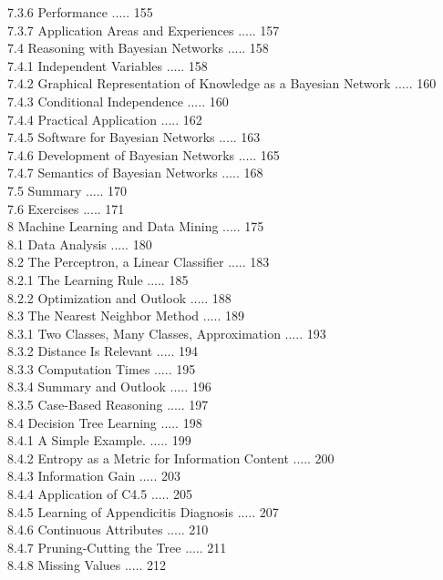 \documentclass[10pt]{book}
\begin{document}
7.3.6 Performance ..... 155\\
7.3.7 Application Areas and Experiences ..... 157\\
7.4 Reasoning with Bayesian Networks ..... 158\\
7.4.1 Independent Variables ..... 158\\
7.4.2 Graphical Representation of Knowledge as a Bayesian Network ..... 160\\
7.4.3 Conditional Independence ..... 160\\
7.4.4 Practical Application ..... 162\\
7.4.5 Software for Bayesian Networks ..... 163\\
7.4.6 Development of Bayesian Networks ..... 165\\
7.4.7 Semantics of Bayesian Networks ..... 168\\
7.5 Summary ..... 170\\
7.6 Exercises ..... 171\\
8 Machine Learning and Data Mining ..... 175\\
8.1 Data Analysis ..... 180\\
8.2 The Perceptron, a Linear Classifier ..... 183\\
8.2.1 The Learning Rule ..... 185\\
8.2.2 Optimization and Outlook ..... 188\\
8.3 The Nearest Neighbor Method ..... 189\\
8.3.1 Two Classes, Many Classes, Approximation ..... 193\\
8.3.2 Distance Is Relevant ..... 194\\
8.3.3 Computation Times ..... 195\\
8.3.4 Summary and Outlook ..... 196\\
8.3.5 Case-Based Reasoning ..... 197\\
8.4 Decision Tree Learning ..... 198\\
8.4.1 A Simple Example. ..... 199\\
8.4.2 Entropy as a Metric for Information Content ..... 200\\
8.4.3 Information Gain ..... 203\\
8.4.4 Application of C4.5 ..... 205\\
8.4.5 Learning of Appendicitis Diagnosis ..... 207\\
8.4.6 Continuous Attributes ..... 210\\
8.4.7 Pruning-Cutting the Tree ..... 211\\
8.4.8 Missing Values ..... 212\\
\end{document}
